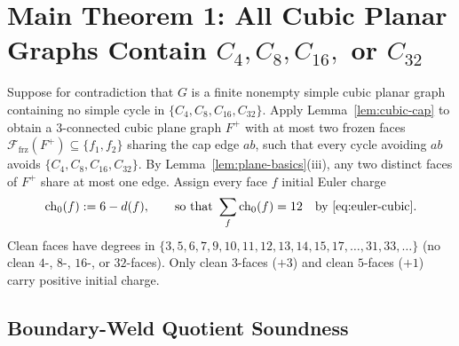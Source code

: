\documentclass[11pt,reqno]{amsart}
\theoremstyle{plain}
\theoremstyle{definition}
\theoremstyle{remark}
\newcommand{\chz}{\mathrm{ch}_0}
\newcommand{\Ffrz}{\mathcal{F}_{\mathrm{frz}}}
\DeclareRobustCommand{\_}{\ifmmode\text{\textunderscore}\else\textunderscore\allowbreak\fi}
\begin{document}
\section{Main Theorem 1: All Cubic Planar Graphs Contain \texorpdfstring{$C_4, C_8, C_{16},$ or $C_{32}$}{C4, C8, C16, or C32}}\label{sec:cubic}

Suppose for contradiction that $G$ is a finite nonempty simple cubic planar graph containing no simple cycle in $\{C_4, C_8, C_{16}, C_{32}\}$. Apply Lemma~\ref{lem:cubic-cap} to obtain a $3$-connected cubic plane graph $F^+$ with at most two frozen faces $\Ffrz(F^+) \subseteq \{f_1, f_2\}$ sharing the cap edge $ab$, such that every cycle avoiding $ab$ avoids $\{C_4, C_8, C_{16}, C_{32}\}$. By Lemma~\ref{lem:plane-basics}(iii), any two distinct faces of $F^+$ share at most one edge. Assign every face $f$ initial Euler charge
\[
  \chz(f) := 6 - d(f), \qquad \text{so that } \sum_{f} \chz(f) = 12 \quad \text{by~\eqref{eq:euler-cubic}.}
\]
Clean faces have degrees in $\{3, 5, 6, 7, 9, 10, 11, 12, 13, 14, 15, 17, \dots, 31, 33, \dots\}$ (no clean $4$-, $8$-, $16$-, or $32$-faces). Only clean $3$-faces ($+3$) and clean $5$-faces ($+1$) carry positive initial charge.

\subsection{Boundary-Weld Quotient Soundness}\label{subsec:weld-soundness}
\end{document}
